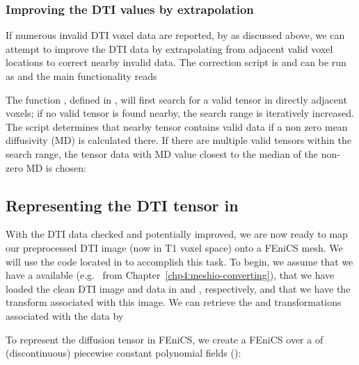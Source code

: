 \subsubsection*{Improving the DTI values by extrapolation}
If numerous invalid DTI voxel data are reported, by  as 
discussed above, we can attempt to improve the DTI data by extrapolating from 
adjacent valid voxel locations to correct nearby invalid data.  The 
correction script is  and can be run as
\noindent and the main functionality reads 

The function , defined in 
, will first search for a valid
tensor in directly adjacent voxels; if no valid tensor is found nearby, the 
search range is iteratively increased.  
The script determines that nearby tensor contains valid data if a non zero mean 
diffusivity (MD) is calculated there. 
If there are multiple valid tensors within the search range, the tensor data 
with MD value closest to the median of the non-zero MD is chosen: 

\subsection{Representing the DTI tensor in \fenics{}}
\label{chp5:sec:loading-dti-tensor}

With the DTI data checked and potentially improved, we are now ready to map 
our preprocessed DTI image (now in T1 voxel space) onto a FEniCS mesh.  We will 
use the code located in  to accomplish this 
task. To begin, we assume that we have a  available (e.g.~%
 from Chapter~\ref{chp4:meshio-converting}), that we have 
loaded the clean DTI image and data in  and , respectively, 
and that we have the  transform associated with this image.  We can retrieve 
the  and  transformations associated with the data 
by 

To represent the diffusion tensor in FEniCS, we create a FEniCS
 over a  of (discontinuous)
piecewise constant polynomial fields (): 

